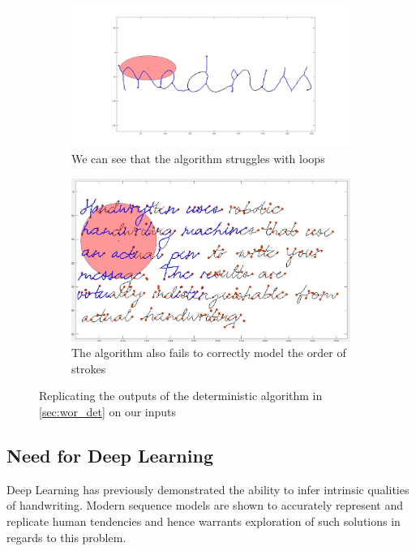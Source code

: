 \documentclass[10pt,twocolumn,letterpaper]{article}
\begin{document}
\begin{figure}[h]
  \centering
  \begin{subfigure}[b]{0.4\textwidth}
    \includegraphics[width=\textwidth]{../latex-src/Images/madness.jpg}
    \caption{We can see that the algorithm struggles with loops}
    \label{fig:bb_img}
  \end{subfigure}
  \hfill
  \begin{subfigure}[b]{0.4\textwidth}
    \includegraphics[width=\textwidth]{../latex-src/Images/deterministic-fail.jpeg}
    \caption{The algorithm also fails to correctly model the order of strokes}
    \label{fig:bb_words}
  \end{subfigure}
  \caption{{Replicating the outputs of the deterministic algorithm in \ref{sec:wor_det} on our inputs}}
  \label{fig:bb}
\end{figure}

\subsection{Need for Deep Learning}

Deep Learning has previously demonstrated the ability to infer intrinsic qualities of handwriting. Modern sequence models are shown to accurately represent and replicate human tendencies and hence warrants exploration of such solutions in regards to this problem.
\end{document}

